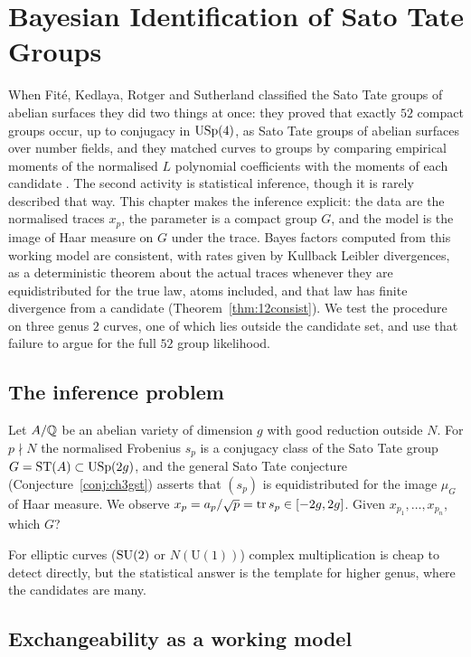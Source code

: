 \chapter{Bayesian Identification of Sato Tate Groups}\label{ch:12}

When Fit\'e, Kedlaya, Rotger and Sutherland classified the Sato Tate groups of abelian surfaces they did two things at once: they proved that exactly $52$ compact groups occur, up to conjugacy in $\mathrm{USp}(4)$, as Sato Tate groups of abelian surfaces over number fields, and they matched curves to groups by comparing empirical moments of the normalised $L$ polynomial coefficients with the moments of each candidate \cite{fkrs2012}. The second activity is statistical inference, though it is rarely described that way. This chapter makes the inference explicit: the data are the normalised traces $x_p$, the parameter is a compact group $G$, and the model is the image of Haar measure on $G$ under the trace. Bayes factors computed from this working model are consistent, with rates given by Kullback Leibler divergences, as a deterministic theorem about the actual traces whenever they are equidistributed for the true law, atoms included, and that law has finite divergence from a candidate (Theorem~\ref{thm:12consist}). We test the procedure on three genus $2$ curves, one of which lies outside the candidate set, and use that failure to argue for the full $52$ group likelihood.

\section{The inference problem}

Let $A/\mathbb{Q}$ be an abelian variety of dimension $g$ with good reduction outside $N$. For $p\nmid N$ the normalised Frobenius $s_p$ is a conjugacy class of the Sato Tate group $G=\mathrm{ST}(A)\subset\mathrm{USp}(2g)$, and the general Sato Tate conjecture (Conjecture~\ref{conj:ch3gst}) asserts that $(s_p)$ is equidistributed for the image $\mu_G$ of Haar measure. We observe $x_p=a_p/\sqrt p=\operatorname{tr} s_p\in[-2g,2g]$. Given $x_{p_1},\dots,x_{p_n}$, which $G$?

For elliptic curves ($\mathrm{SU}(2)$ or $N(\mathrm{U}(1))$) complex multiplication is cheap to detect directly, but the statistical answer is the template for higher genus, where the candidates are many.

\section{Exchangeability as a working model}

